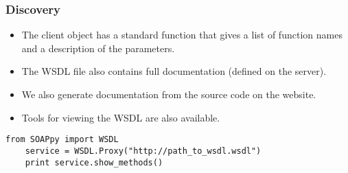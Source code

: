 \begin{frame}[fragile]
  \frametitle{Discovery}

  \begin{itemize}
    \item The client object has a standard function that gives a list of
      function names and a description of the parameters.
    \item The WSDL file also contains full documentation (defined on the
      server).
    \item We also generate documentation from the source code on the website.
    \item Tools for viewing the WSDL are also available.
  \end{itemize}
  \bigskip
  \bigskip
  \pause

  \begin{lstlisting}[caption = {WSDL}]
    from SOAPpy import WSDL
    service = WSDL.Proxy("http://path_to_wsdl.wsdl")
    print service.show_methods()
  \end{lstlisting}
\end{frame}
